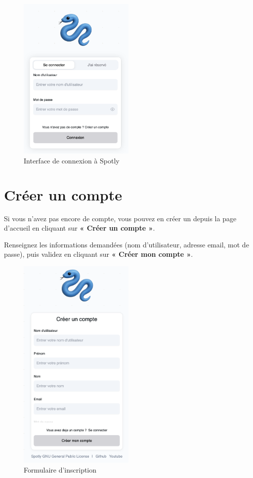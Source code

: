 \documentclass[a4paper,12pt]{article}
\begin{document}
\begin{figure}[h!]
    \centering
    \includegraphics[width=0.5\textwidth]{UTILISATEUR/LOGIN.png}
    \caption{Interface de connexion à Spotly}
    \label{fig:login}
\end{figure}

\newpage

\section{Créer un compte}

Si vous n’avez pas encore de compte, vous pouvez en créer un depuis la page d’accueil en cliquant sur \textbf{« Créer un compte »}.

Renseignez les informations demandées (nom d’utilisateur, adresse email, mot de passe), puis validez en cliquant sur \textbf{« Créer mon compte »}.

\begin{figure}[h!]
    \centering
    \includegraphics[width=0.5\textwidth]{UTILISATEUR/REGISTER.png}
    \caption{Formulaire d’inscription}
    \label{fig:register}
\end{figure}
\end{document}
